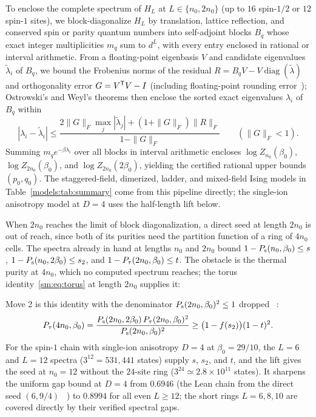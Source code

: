 To enclose the complete spectrum of $H_L$ at $L\in\{n_0,2n_0\}$ (up to
$16$ spin-$1/2$ or $12$ spin-$1$ sites), we block-diagonalize $H_L$ by
translation, lattice reflection, and conserved spin or parity quantum
numbers into self-adjoint blocks $B_q$ whose exact integer multiplicities
$m_q$ sum to $d^L$, with every entry enclosed in rational or interval
arithmetic. From a floating-point eigenbasis $V$ and candidate
eigenvalues $\tilde\lambda_i$ of $B_q$, we bound the Frobenius norms of
the residual $R=B_qV-V\operatorname{diag}(\tilde\lambda)$ and orthogonality
error $G=V^{\mathsf T}V-I$ (including floating-point rounding
error~\cite{Rump2010Verification}); Ostrowski's and Weyl's theorems then
enclose the sorted exact eigenvalues $\lambda_i$ of $B_q$ within
\begin{equation}
    |\lambda_i-\tilde\lambda_i|\le
    \frac{2\|G\|_F\max_j|\tilde\lambda_j|+(1+\|G\|_F)\|R\|_F}{1-\|G\|_F}
    \qquad(\|G\|_F<1).
    \label{models:eq:weyl}
\end{equation}
Summing $m_qe^{-\beta\lambda_i}$ over all blocks in interval arithmetic
encloses $\log Z_{n_0}(\beta_0)$, $\log Z_{2n_0}(\beta_0)$, and
$\log Z_{2n_0}(2\beta_0)$, yielding the certified rational upper bounds
$(p_0,q_0)$. The staggered-field, dimerized, ladder, and mixed-field
Ising models in Table~\ref{models:tab:summary} come from this pipeline
directly; the single-ion anisotropy model at $D=4$ uses the half-length
lift below.

When $2n_0$ reaches the limit of block diagonalization, a direct seed at
length $2n_0$ is out of reach, since both of its purities need the
partition function of a ring of $4n_0$ cells. The spectra already in
hand at lengths $n_0$ and $2n_0$ bound $1-P_{\mathrm s}(n_0,\beta_0)\le s$,
$1-P_{\mathrm s}(n_0,2\beta_0)\le s_2$, and $1-P_{\tau}(2n_0,\beta_0)\le t$. The
obstacle is the thermal purity at $4n_0$, which no computed spectrum
reaches; the torus identity~\eqref{sm:eq:torus} at length $2n_0$
supplies it:
\begin{proofdiagram}
    \halflengthlift
\end{proofdiagram}
Move 2 is this identity with the denominator $P_{\mathrm s}(2n_0,\beta_0)^2\le1$
dropped%
~:
\begin{equation}
    P_{\tau}(4n_0,\beta_0)
    =\frac{P_{\mathrm s}(2n_0,2\beta_0)\,P_{\tau}(2n_0,\beta_0)^2}{P_{\mathrm s}(2n_0,\beta_0)^2}
    \ge\bigl(1-f(s_2)\bigr)(1-t)^2.
    \label{models:eq:half-length}
\end{equation}
For the spin-$1$ chain with single-ion anisotropy $D=4$ at
$\beta_0=29/10$, the $L=6$ and $L=12$ spectra ($3^{12}=531{,}441$
states) supply $s$, $s_2$, and $t$, and the lift gives the seed at
$n_0=12$ without the $24$-site ring ($3^{24}\simeq2.8\times10^{11}$
states). It sharpens the uniform gap bound at $D=4$ from $0.6946$ (the
Lean chain from the direct seed $(6,9/4)$%
~)
to $0.8994$ for all even
$L\ge12$; the short rings $L=6,8,10$ are covered directly by their
verified spectral gaps.

